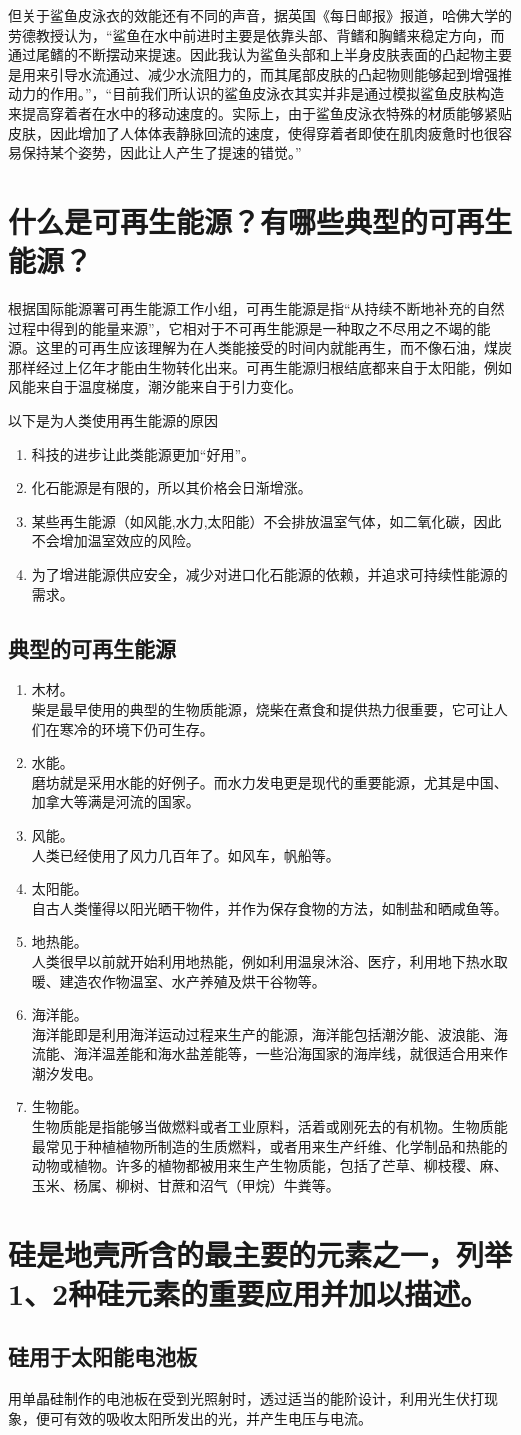 \documentclass[UTF8,9pt]{ctexart}
\newcommand\se{\section}                                               %
\newcommand\sub{\subsection}                                           %
\newcommand{\rk}[1]{\begin{enumerate}                              %
        #1
    \end{enumerate}}
\begin{document}
但关于鲨鱼皮泳衣的效能还有不同的声音，据英国《每日邮报》报道，哈佛大学的劳德教授认为，``鲨鱼在水中前进时主要是依靠头部、背鳍和胸鳍来稳定方向，而通过尾鳍的不断摆动来提速。因此我认为鲨鱼头部和上半身皮肤表面的凸起物主要是用来引导水流通过、减少水流阻力的，而其尾部皮肤的凸起物则能够起到增强推动力的作用。''，``目前我们所认识的鲨鱼皮泳衣其实并非是通过模拟鲨鱼皮肤构造来提高穿着者在水中的移动速度的。实际上，由于鲨鱼皮泳衣特殊的材质能够紧贴皮肤，因此增加了人体体表静脉回流的速度，使得穿着者即使在肌肉疲惫时也很容易保持某个姿势，因此让人产生了提速的错觉。''
\se{什么是可再生能源？有哪些典型的可再生能源？}
根据国际能源署可再生能源工作小组，可再生能源是指“从持续不断地补充的自然过程中得到的能量来源”，它相对于不可再生能源是一种取之不尽用之不竭的能源。这里的可再生应该理解为在人类能接受的时间内就能再生，而不像石油，煤炭那样经过上亿年才能由生物转化出来。可再生能源归根结底都来自于太阳能，例如风能来自于温度梯度，潮汐能来自于引力变化。

以下是为人类使用再生能源的原因
\rk{
    \item 科技的进步让此类能源更加“好用”。
    \item 化石能源是有限的，所以其价格会日渐增涨。
    \item 某些再生能源（如风能,水力,太阳能）不会排放温室气体，如二氧化碳，因此不会增加温室效应的风险。
    \item 为了增进能源供应安全，减少对进口化石能源的依赖，并追求可持续性能源的需求。
}
\sub{典型的可再生能源}
\rk{
    \item 木材。\\柴是最早使用的典型的生物质能源，烧柴在煮食和提供热力很重要，它可让人们在寒冷的环境下仍可生存。
    \item 水能。\\磨坊就是采用水能的好例子。而水力发电更是现代的重要能源，尤其是中国、加拿大等满是河流的国家。
    \item 风能。\\人类已经使用了风力几百年了。如风车，帆船等。
    \item 太阳能。\\自古人类懂得以阳光晒干物件，并作为保存食物的方法，如制盐和晒咸鱼等。
    \item 地热能。\\人类很早以前就开始利用地热能，例如利用温泉沐浴、医疗，利用地下热水取暖、建造农作物温室、水产养殖及烘干谷物等。
    \item 海洋能。\\海洋能即是利用海洋运动过程来生产的能源，海洋能包括潮汐能、波浪能、海流能、海洋温差能和海水盐差能等，一些沿海国家的海岸线，就很适合用来作潮汐发电。
    \item 生物能。\\生物质能是指能够当做燃料或者工业原料，活着或刚死去的有机物。生物质能最常见于种植植物所制造的生质燃料，或者用来生产纤维、化学制品和热能的动物或植物。许多的植物都被用来生产生物质能，包括了芒草、柳枝稷、麻、玉米、杨属、柳树、甘蔗和沼气（甲烷）牛粪等。
}
\se{硅是地壳所含的最主要的元素之一，列举1、2种硅元素的重要应用并加以描述。}
\sub{硅用于太阳能电池板}
用单晶硅制作的电池板在受到光照射时，透过适当的能阶设计，利用光生伏打现象，便可有效的吸收太阳所发出的光，并产生电压与电流。
\end{document}
